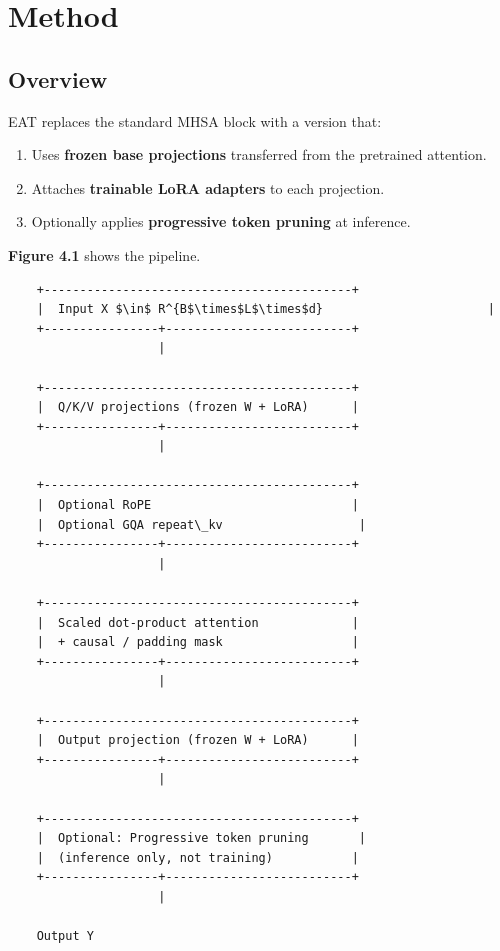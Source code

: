 
\section{Method}

\subsection{Overview}

EAT replaces the standard MHSA block with a version that:

\begin{enumerate}
\item Uses \textbf{frozen base projections} transferred from the pretrained attention.
\item Attaches \textbf{trainable LoRA adapters} to each projection.
\item Optionally applies \textbf{progressive token pruning} at inference.

\end{enumerate}
\textbf{Figure 4.1} shows the pipeline.

\begin{lstlisting}
    +-------------------------------------------+
    |  Input X $\in$ R^{B$\times$L$\times$d}                       |
    +----------------+--------------------------+
                     |
                      
    +-------------------------------------------+
    |  Q/K/V projections (frozen W + LoRA)      |
    +----------------+--------------------------+
                     |
                      
    +-------------------------------------------+
    |  Optional RoPE                            |
    |  Optional GQA repeat\_kv                   |
    +----------------+--------------------------+
                     |
                      
    +-------------------------------------------+
    |  Scaled dot-product attention             |
    |  + causal / padding mask                  |
    +----------------+--------------------------+
                     |
                      
    +-------------------------------------------+
    |  Output projection (frozen W + LoRA)      |
    +----------------+--------------------------+
                     |
                      
    +-------------------------------------------+
    |  Optional: Progressive token pruning       |
    |  (inference only, not training)           |
    +----------------+--------------------------+
                     |
                      
    Output Y
\end{lstlisting}

